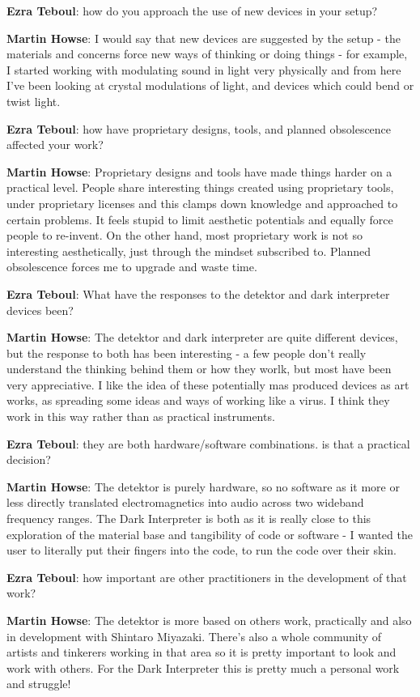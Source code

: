 \textbf{Ezra Teboul}: how do you approach the use of new devices in your setup?

\textbf{Martin Howse}: I would say that new devices are suggested by the setup - the
materials and concerns force new ways of thinking or doing things - for example, I
started working with modulating sound in light very physically and from here I've been
looking at crystal modulations of light, and devices which could bend or twist light.

\textbf{Ezra Teboul}: how have proprietary designs, tools, and planned obsolescence
affected your work?

\textbf{Martin Howse}: Proprietary designs and tools have made things harder on a
practical level. People share interesting things created using proprietary tools, under
proprietary licenses and this clamps down knowledge and approached to certain problems.
It feels stupid to limit aesthetic potentials and equally force people to re-invent. On
the other hand, most proprietary work is not so interesting aesthetically, just through
the mindset subscribed to. Planned obsolescence forces me to upgrade and waste time.

\textbf{Ezra Teboul}: What have the responses to the detektor and dark interpreter
devices been?

\textbf{Martin Howse}: The detektor and dark interpreter are quite different devices,
but the response to both has been interesting - a few people don't really understand the
thinking behind them or how they worlk, but most have been very appreciative. I like the
idea of these potentially mas produced devices as art works, as spreading some ideas and
ways of working like a virus. I think they work in this way rather than as practical
instruments.

\textbf{Ezra Teboul}: they are both hardware/software combinations. is that a practical
decision?

\textbf{Martin Howse}: The detektor is purely hardware, so no software as it more or
less directly translated electromagnetics into audio across two wideband frequency
ranges. The Dark Interpreter is both as it is really close to this exploration of the
material base and tangibility of code or software - I wanted the user to literally put
their fingers into the code, to run the code over their skin.

\textbf{Ezra Teboul}: how important are other practitioners in the development of that
work?

\textbf{Martin Howse}: The detektor is more based on others work, practically and also
in development with Shintaro Miyazaki. There's also a whole community of artists and
tinkerers working in that area so it is pretty important to look and work with others.
For the Dark Interpreter this is pretty much a personal work and struggle!

